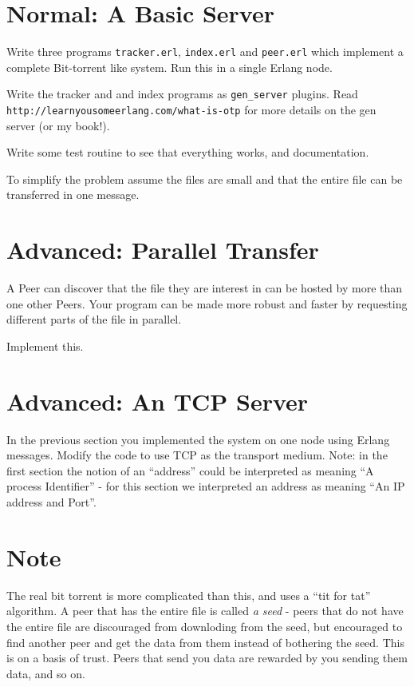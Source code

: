 \documentclass[12pt]{hitec}
\begin{document}
\section{Normal: A Basic Server}

Write three programs \verb+tracker.erl+, \verb+index.erl+ and \verb+peer.erl+
which implement a complete Bit-torrent like system. Run this in a single Erlang node.

Write the tracker and and index programs as \verb+gen_server+ plugins.
Read \verb+http://learnyousomeerlang.com/what-is-otp+ for more details
on the gen server (or my book!).

Write some test routine to see that everything works, and documentation.

To simplify the problem assume the files are small and that the entire file
can be transferred in one message.

\section{Advanced: Parallel Transfer}

A Peer can discover that the file they are interest in can be hosted
by more than one other Peers. Your program can be made more robust and
faster by requesting different parts of the file in parallel.

Implement this.

\section{Advanced: An TCP Server}

In the previous section you implemented the system on one node using
Erlang messages.  Modify the code to use TCP as the transport
medium. Note: in the first section the notion of an ``address'' could
be interpreted as meaning ``A process Identifier'' - for this section
we interpreted an address as meaning ``An IP address and Port''.


\section*{Note}

The real bit torrent is more complicated than this, and uses a ``tit
for tat'' algorithm.  A peer that has the entire file is called {\sl a
  seed} - peers that do not have the entire file are discouraged from
downloding from the seed, but encouraged to find another peer and get
the data from them instead of bothering the seed. This is on a basis
of trust. Peers that send you data are rewarded by you sending them
data, and so on.
\end{document}

